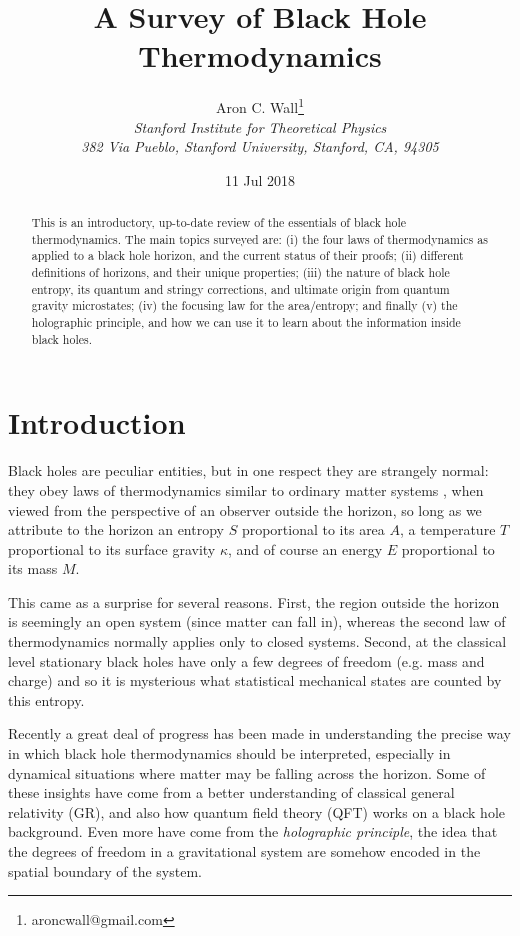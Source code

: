 \documentclass[12pt]{article}
\date{11 Jul 2018}
\author{Aron C. Wall\footnote{aroncwall@gmail.com}
\\ \textit{Stanford Institute for Theoretical Physics}
\\ \textit{382 Via Pueblo, Stanford University, Stanford, CA, 94305} }
\title{A Survey of Black Hole Thermodynamics}
\begin{document}
\maketitle

\begin{abstract}
This is an introductory, up-to-date review of the essentials of black hole thermodynamics.  The main topics surveyed are: (i) the four laws of thermodynamics as applied to a black hole horizon, and the current status of their proofs; (ii) different definitions of horizons, and their unique properties; (iii) the nature of black hole entropy, its quantum and stringy corrections, and ultimate origin from quantum gravity microstates; (iv) the focusing law for the area/entropy; and finally (v) the holographic principle, and how we can use it to learn about the information inside black holes.
\end{abstract}

\begin{center}
\medskip\medskip\medskip
{}
\end{center}

\newpage
\tableofcontents

\newpage

\section{Introduction}

Black holes are peculiar entities, but in one respect they are strangely normal: they obey laws of thermodynamics similar to ordinary matter systems \cite{bardeen1973four}, when viewed from the perspective of an observer outside the horizon, so long as we attribute to the horizon an entropy $S$ proportional to its area $A$, a temperature $T$ proportional to its surface gravity $\kappa$, and of course an energy $E$ proportional to its mass $M$.

This came as a surprise for several reasons.  First, the region outside the horizon is seemingly an open system (since matter can fall in), whereas the second law of thermodynamics normally applies only to closed systems.  Second, at the classical level stationary black holes have only a few degrees of freedom (e.g. mass and charge) and so it is mysterious what statistical mechanical states are counted by this entropy.

Recently a great deal of progress has been made in understanding the precise way in which black hole thermodynamics should be interpreted, especially in dynamical situations where matter may be falling across the horizon.  Some of these insights have come from a better understanding of classical general relativity (GR), and also how quantum field theory (QFT) works on a black hole background.  Even more have come from the \emph{holographic principle}, the idea that the degrees of freedom in a gravitational system are somehow encoded in the spatial boundary of the system.
\end{document}
